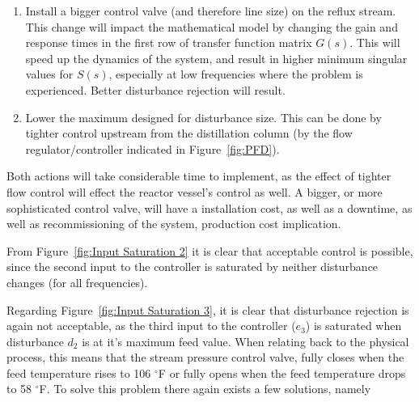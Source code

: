 \begin{enumerate}
	\item Install a bigger control valve (and therefore line size) on the reflux stream. This change will impact the mathematical model by changing the gain and response times in the first row of transfer function matrix $G(s)$. This will speed up the dynamics of the system, and result in higher minimum singular values for $S(s)$, especially at low frequencies where the problem is experienced. Better disturbance rejection will result.
	
	\item Lower the maximum designed for disturbance size. This can be done by tighter control upstream from the distillation column (by the flow regulator/controller indicated in Figure~\ref{fig:PFD}).
	
\end{enumerate}   

Both actions will take considerable time to implement, as the effect of tighter flow control will effect the reactor vessel's control as well. A bigger, or more sophisticated control valve, will have a installation cost, as well as a downtime, as well as recommissioning of the system, production cost implication. 

From Figure~\ref{fig:Input Saturation 2} it is clear that acceptable control is possible, since the second input to the controller is saturated by neither disturbance changes (for all frequencies).

Regarding Figure~\ref{fig:Input Saturation 3}, it is clear that disturbance rejection is again not acceptable, as the third input to the controller ($e_3$) is saturated when disturbance $d_2$ is at it's maximum feed value. When relating back to the physical process, this means that the stream pressure control valve, fully closes when the feed temperature rises to 106 $^{\circ}$F or fully opens when the feed temperature drops to 58 $^{\circ}$F. To solve this problem there again exists a few solutions, namely

